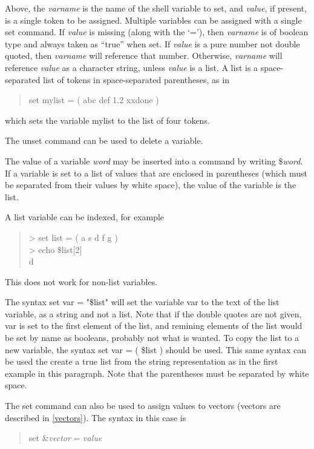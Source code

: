 Above, the {\it varname} is the name of the shell variable to set, and
{\it value}, if present, is a single token to be assigned. 
Multiple variables can be assigned with a single {\cb set} command. 
If {\it value} is missing (along with the `{\vt =}'), then {\it
varname} is of boolean type and always taken as ``true'' when set. 
If {\it value} is a pure number not double quoted, then {\it
varname} will reference that number.  Otherwise, {\it varname} will
reference {\it value} as a character string, unless {\it value} is
a list.  A list is a space-separated list of tokens in space-separated
parentheses, as in
\begin{quote}\vt
set mylist = ( abc def 1.2 xxdone )
\end{quote}
which sets the variable {\vt mylist} to the list of four tokens.

The {\cb unset} command can be used to delete a variable.

The value of a variable {\it word\/} may be inserted into a command by
writing {\vt \${\it word}}.  If a variable is set to a list of values
that are enclosed in parentheses (which must be separated from their
values by white space), the value of the variable is the list.

A list variable can be indexed, for example
\begin{quote}\vt
> set list = ( a s d f g )\\
> echo \$list[2]\\
d
\end{quote}
This does not work for non-list variables.

The syntax {\vt set var = "\$list"} will set the variable {\vt var} to
the text of the list variable, as a string and not a list.  Note that
if the double quotes are not given, {\vt var} is set to the first
element of the list, and remining elements of the list would be set by
name as booleans, probably not what is wanted.  To copy the list to a
new variable, the syntax {\vt set var = ( \$list )} should be used. 
This same syntax can be used the create a true list from the string
representation as in the first example in this paragraph.  Note that
the parentheses must be separated by white space.

The set command can also be used to assign values to vectors (vectors
are described in \ref{vectors}).  The syntax in this case is
 
\begin{quote}
{\vt set \&}{\it vector} {\vt =} {\it value}
\end{quote}
 
